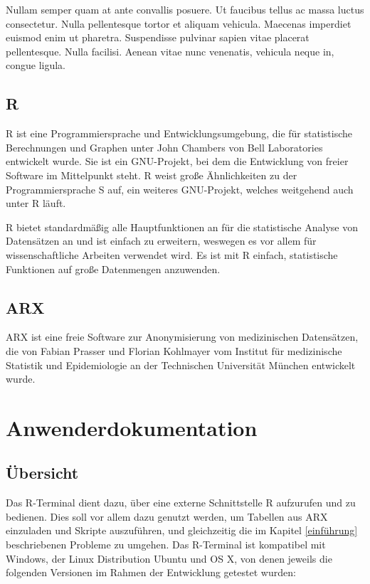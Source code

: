 \documentclass[a4paper, 12pt]{report} %
\begin{document}
Nullam semper quam at ante convallis posuere. Ut faucibus tellus ac massa luctus consectetur. Nulla pellentesque tortor et aliquam vehicula. Maecenas imperdiet euismod enim ut pharetra. Suspendisse pulvinar sapien vitae placerat pellentesque. Nulla facilisi. Aenean vitae nunc venenatis, vehicula neque in, congue ligula.


\section*{R}\label{r}
R ist eine Programmiersprache und Entwicklungsumgebung, die für statistische Berechnungen und Graphen unter John Chambers von Bell Laboratories entwickelt wurde. Sie ist ein GNU-Projekt, bei dem die Entwicklung von freier Software im Mittelpunkt steht. R weist große Ähnlichkeiten zu der Programmiersprache S auf, ein weiteres GNU-Projekt, welches weitgehend auch unter R läuft. \cite{rproject}

R bietet standardmäßig alle Hauptfunktionen an für die statistische Analyse von Datensätzen an und ist einfach zu erweitern, weswegen es vor allem für wissenschaftliche Arbeiten verwendet wird. Es ist mit R einfach, statistische Funktionen auf große Datenmengen anzuwenden.  



\section*{ARX}
ARX ist eine freie Software zur Anonymisierung von medizinischen Datensätzen, die von Fabian Prasser und Florian Kohlmayer vom Institut für medizinische Statistik und Epidemiologie an der Technischen Universität München entwickelt wurde.



\chapter{Anwenderdokumentation}
\section{Übersicht}
Das R-Terminal dient dazu, über eine externe Schnittstelle R aufzurufen und zu bedienen. Dies soll vor allem dazu genutzt werden, um Tabellen aus ARX einzuladen und Skripte auszuführen, und gleichzeitig die im Kapitel \ref{einführung} beschriebenen Probleme zu umgehen. Das R-Terminal ist kompatibel mit Windows, der Linux Distribution Ubuntu und OS X, von denen jeweils die folgenden Versionen im Rahmen der Entwicklung getestet wurden: 
\end{document}
